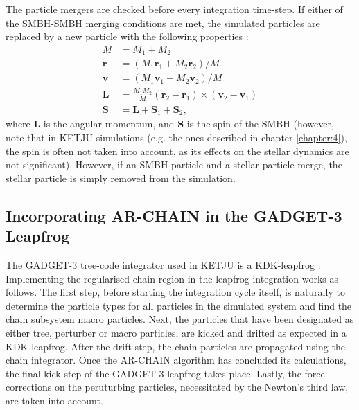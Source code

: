 \documentclass[english, twoside]{HYgradu}
\begin{document}
The particle mergers are checked before every integration time-step. If either of the SMBH-SMBH merging conditions are met, the simulated particles are replaced by a new particle with the following properties \citep{Rantala2017KETJU}:
\begin{equation}
\begin{split}
M &= M_1 + M_2 \\
\mathbf{r} &= (M_1 \mathbf{r}_1 + M_2 \mathbf{r}_2) / M \\
\mathbf{v} &= (M_1 \mathbf{v}_1 + M_2 \mathbf{v}_2) / M \\
\mathbf{L} &= \frac{M_1 M_2}{M} (\mathbf{r}_2 - \mathbf{r}_1) \times (\mathbf{v}_2 - \mathbf{v}_1) \\
\mathbf{S} &= \mathbf{L} + \mathbf{S}_1 + \mathbf{S}_2,
\end{split}
\end{equation}
where $\mathbf{L}$ is the angular momentum, and $\mathbf{S}$ is the spin of the SMBH (however, note that in KETJU simulations (e.g. the ones described in chapter \ref{chapter:4}), the spin is often not taken into account, as its effects on the stellar dynamics are not significant). However, if an SMBH particle and a stellar particle merge, the stellar particle is simply removed from the simulation.

\subsection{Incorporating AR-CHAIN in the GADGET-3 Leapfrog} \label{section:archain_plus_gadget}

The GADGET-3 tree-code integrator used in KETJU is a KDK-leapfrog \citep{Springel2005}. Implementing the regularised chain region in the leapfrog integration works as follows. The first step, before starting the integration cycle itself, is naturally to determine the particle types for all particles in the simulated system and find the chain subsystem macro particles. Next, the particles that have been designated as either tree, perturber or macro particles, are kicked and drifted as expected in a KDK-leapfrog. After the drift-step, the chain particles are propagated using the chain integrator. Once the AR-CHAIN algorithm has concluded its calculations, the final kick step of the GADGET-3 leapfrog takes place. Lastly, the force corrections on the peruturbing particles, necessitated by the Newton's third law, are taken into account. 
\end{document}
